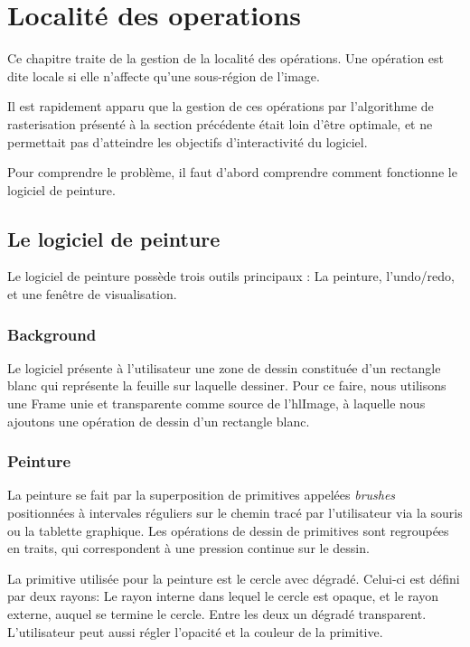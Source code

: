 \chapter{Localité des operations}
	Ce chapitre traite de la gestion de la localité des opérations. Une
	opération est dite locale si elle n'affecte qu'une sous-région de l'image.

	Il est rapidement apparu que la gestion de ces opérations par l'algorithme
	de rasterisation présenté à la section précédente était loin d'être optimale,
	et ne permettait pas d'atteindre les objectifs d'interactivité du logiciel.

	Pour comprendre le problème, il faut d'abord comprendre comment fonctionne le
	logiciel de peinture. 
	\section{Le logiciel de peinture}
		Le logiciel de peinture possède trois outils principaux : La peinture,
		l'undo/redo, et une fenêtre de visualisation.
		\subsection{Background}
			Le logiciel présente à l'utilisateur une zone de dessin constituée d'un
			rectangle blanc qui représente la feuille sur laquelle dessiner. 
			Pour ce faire, nous utilisons une Frame unie et transparente comme source
			de l'hlImage, à laquelle nous ajoutons une opération de dessin d'un
			rectangle blanc. 
		\subsection{Peinture}
			La peinture se fait par la superposition de primitives appelées \emph{brushes}
			positionnées
			à intervales réguliers sur le chemin tracé par l'utilisateur via la
			souris ou la tablette graphique. Les opérations de dessin de primitives 
			sont regroupées en traits, qui correspondent à une pression 
			continue sur le dessin. 

			La primitive utilisée pour la peinture est le cercle avec dégradé. Celui-ci
			est défini par deux rayons: Le rayon interne dans lequel le cercle est opaque,
			et le rayon externe, auquel se termine le cercle. Entre les deux un dégradé
			transparent. L'utilisateur peut aussi régler 
			l'opacité et la couleur de la primitive.

